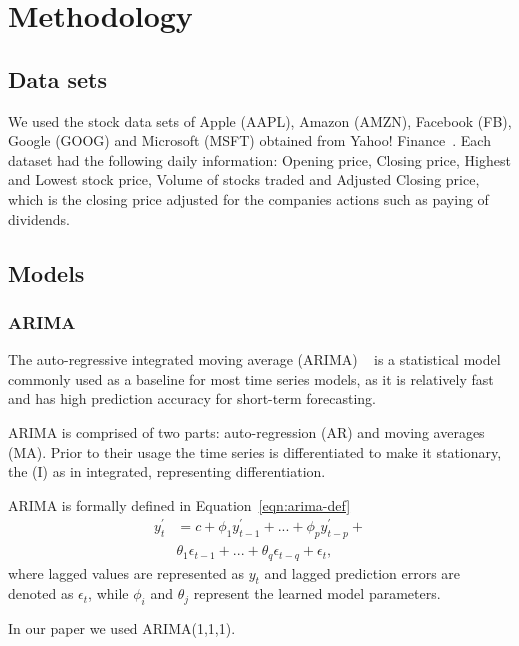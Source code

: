 \documentclass[12pt,journal,compsoc]{IEEEtran}
\begin{document}
\section{Methodology}
\subsection{Data sets}
\par We used the stock data sets of Apple (AAPL), Amazon (AMZN), Facebook (FB), Google (GOOG) and Microsoft (MSFT) obtained from Yahoo! Finance~\cite{edgar}.
Each dataset had the following daily information: Opening price, Closing price, Highest and Lowest stock price, Volume of stocks traded
and Adjusted Closing price, which is the closing price adjusted for the companies actions such as paying of dividends.

\subsection{Models}
\subsubsection{ARIMA}
\par The auto-regressive integrated moving average (ARIMA) ~\cite{hyndman} is a statistical model commonly used as a baseline for most time series models, as it is
relatively fast and has high prediction accuracy for short-term forecasting.
\par ARIMA is comprised of two parts: auto-regression (AR) and moving averages (MA).
Prior to their usage the time series is differentiated to make it stationary, the (I) as in integrated, representing differentiation.
\par ARIMA is formally defined in Equation~\ref{eqn:arima-def}
\begin{equation}
    \label{eqn:arima-def}
    \begin{aligned}
        y^{'}_t &= c + \phi_1 y^{'}_{t-1} + ... + \phi_p y^{'}_{t-p} + \\
                &    \theta_1 \epsilon_{t-1} + ... + \theta_q \epsilon_{t-q} + \epsilon_t,
    \end{aligned}
\end{equation}
where lagged values are represented as $y_t$ and lagged prediction errors are denoted as $\epsilon_t$, while $\phi_i$ and $\theta_j$ represent the learned model parameters.
\par In our paper we used ARIMA(1,1,1).
\end{document}
